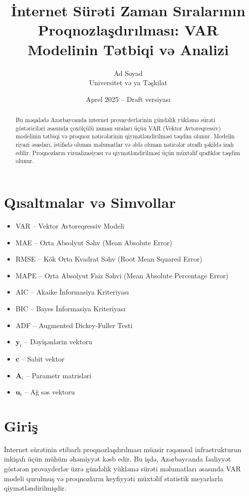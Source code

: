 \documentclass[12pt,a4paper]{article}
\title{İnternet Sürəti Zaman Sıralarının Proqnozlaşdırılması: VAR Modelinin Tətbiqi və Analizi}
\author{Ad Soyad \\ Universitet və ya Təşkilat}
\date{Aprel 2025 -- Draft versiyası}
\begin{document}
\maketitle

\begin{abstract}
Bu məqalədə Azərbaycanda internet provayderlərinin gündəlik yükləmə sürəti göstəriciləri əsasında çoxölçülü zaman sıraları üçün VAR (Vektor Avtoreqressiv) modelinin tətbiqi və proqnoz nəticələrinin qiymətləndirilməsi təqdim olunur. Modelin riyazi əsasları, istifadə olunan məlumatlar və əldə olunan nəticələr ətraflı şəkildə izah edilir. Proqnozların vizualizasiyası və qiymətləndirilməsi üçün müxtəlif qrafiklər təqdim olunur.
\end{abstract}

\section*{Qısaltmalar və Simvollar}
\begin{itemize}
    \item VAR -- Vektor Avtoreqressiv Modeli
    \item MAE -- Orta Absolyut Səhv (Mean Absolute Error)
    \item RMSE -- Kök Orta Kvadrat Səhv (Root Mean Squared Error)
    \item MAPE -- Orta Absolyut Faiz Səhvi (Mean Absolute Percentage Error)
    \item AIC -- Akaike İnformasiya Kriteriyası
    \item BIC -- Bayes İnformasiya Kriteriyası
    \item ADF -- Augmented Dickey-Fuller Testi
    \item $\mathbf{y}_t$ -- Dəyişənlərin vektoru
    \item $\mathbf{c}$ -- Sabit vektor
    \item $\mathbf{A}_i$ -- Parametr matrisləri
    \item $\mathbf{u}_t$ -- Ağ səs vektoru
\end{itemize}

\section{Giriş}
İnternet sürətinin etibarlı proqnozlaşdırılması müasir rəqəmsal infrastrukturun inkişafı üçün mühüm əhəmiyyət kəsb edir. Bu işdə, Azərbaycanda fəaliyyət göstərən provayderlər üzrə gündəlik yükləmə sürəti məlumatları əsasında VAR modeli qurulmuş və proqnozların keyfiyyəti müxtəlif statistik meyarlarla qiymətləndirilmişdir.
\end{document}
